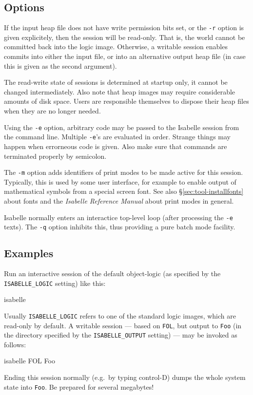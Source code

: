 \subsection*{Options}

If the input heap file does not have write permission bits set, or the
\texttt{-r} option is given explicitely, then the session will be
read-only. That is, the {\ML} world cannot be committed back into the
logic image.  Otherwise, a writable session enables commits into
either the input file, or into an alternative output heap file (in
case this is given as the second argument).

The read-write state of sessions is determined at startup only, it
cannot be changed intermediately. Also note that heap images may
require considerable amounts of disk space. Users are responsible
themselves to dispose their heap files when they are no longer needed.

\medskip Using the \texttt{-e} option, arbitrary {\ML} code may be
passed to the Isabelle session from the command line. Multiple
\texttt{-e}'s are evaluated in order. Strange things may happen when
errorneous {\ML} code is given. Also make sure that commands are
terminated properly by semicolon.

\medskip The \texttt{-m} option adds identifiers of print modes to be
made active for this session. Typically, this is used by some user
interface, for example to enable output of mathematical symbols from a
special screen font. See also \S\ref{sec:tool-installfonts} about
fonts and the \emph{Isabelle Reference Manual} about print modes in
general.

\medskip Isabelle normally enters an interactice {\ML} top-level loop
(after processing the \texttt{-e} texts). The \texttt{-q} option
inhibits this, thus providing a pure batch mode facility.


\subsection*{Examples}

Run an interactive session of the default object-logic (as specified
by the \texttt{ISABELLE_LOGIC} setting) like this:
\begin{ttbox}
isabelle
\end{ttbox}
Usually \texttt{ISABELLE_LOGIC} refers to one of the standard logic
images, which are read-only by default.  A writable session --- based
on \texttt{FOL}, but output to \texttt{Foo} (in the directory
specified by the \texttt{ISABELLE_OUTPUT} setting) --- may be invoked
as follows:
\begin{ttbox}
isabelle FOL Foo
\end{ttbox}
Ending this session normally (e.g.\ by typing control-D) dumps the
whole {\ML} system state into \texttt{Foo}. Be prepared for several
megabytes!

